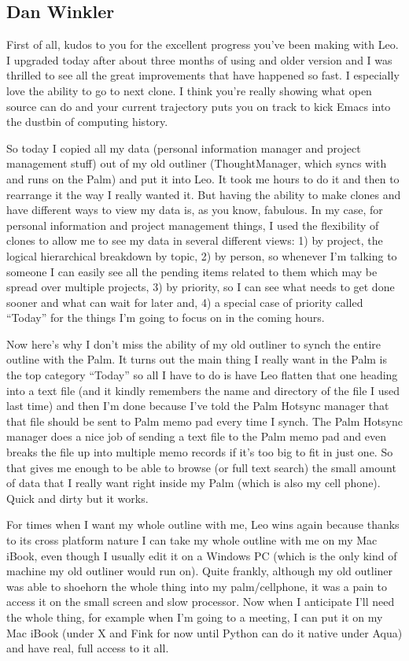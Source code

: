 \documentclass[a4paper,10pt,english]{sphinxmanual}
\begin{document}
\subsection{Dan Winkler}
\label{testimonials:dan-winkler}
First of all, kudos to you for the excellent progress you've been making with
Leo. I upgraded today after about three months of using and older version and I
was thrilled to see all the great improvements that have happened so fast. I
especially love the ability to go to next clone. I think you're really showing
what open source can do and your current trajectory puts you on track to kick
Emacs into the dustbin of computing history.

So today I copied all my data (personal information manager and project
management stuff) out of my old outliner (ThoughtManager, which syncs with and
runs on the Palm) and put it into Leo. It took me hours to do it and then to
rearrange it the way I really wanted it. But having the ability to make clones
and have different ways to view my data is, as you know, fabulous. In my case,
for personal information and project management things, I used the flexibility
of clones to allow me to see my data in several different views: 1) by project,
the logical hierarchical breakdown by topic, 2) by person, so whenever I'm
talking to someone I can easily see all the pending items related to them which
may be spread over multiple projects, 3) by priority, so I can see what needs to
get done sooner and what can wait for later and, 4) a special case of priority
called ``Today'' for the things I'm going to focus on in the coming hours.

Now here's why I don't miss the ability of my old outliner to synch the entire
outline with the Palm. It turns out the main thing I really want in the Palm is
the top category ``Today'' so all I have to do is have Leo flatten that one
heading into a text file (and it kindly remembers the name and directory of the
file I used last time) and then I'm done because I've told the Palm Hotsync
manager that that file should be sent to Palm memo pad every time I synch. The
Palm Hotsync manager does a nice job of sending a text file to the Palm memo pad
and even breaks the file up into multiple memo records if it's too big to fit in
just one. So that gives me enough to be able to browse (or full text search) the
small amount of data that I really want right inside my Palm (which is also my
cell phone). Quick and dirty but it works.

For times when I want my whole outline with me, Leo wins again because thanks to
its cross platform nature I can take my whole outline with me on my Mac iBook,
even though I usually edit it on a Windows PC (which is the only kind of machine
my old outliner would run on). Quite frankly, although my old outliner was able
to shoehorn the whole thing into my palm/cellphone, it was a pain to access it
on the small screen and slow processor. Now when I anticipate I'll need the
whole thing, for example when I'm going to a meeting, I can put it on my Mac
iBook (under X and Fink for now until Python can do it native under Aqua) and
have real, full access to it all.
\end{document}
